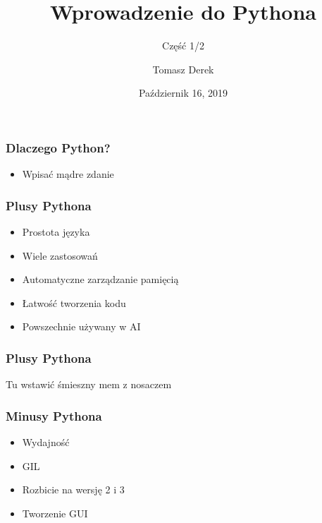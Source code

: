 \documentclass[17pt]{beamer}
\title{Wprowadzenie do Pythona}
\subtitle{Część 1/2}
\author{Tomasz Derek}
\institute{KMS}
\date{Październik 16, 2019}
\begin{document}
 
\frame{\titlepage}
 
\begin{frame}
\frametitle{Dlaczego Python?}
\begin{itemize}
\item Wpisać mądre zdanie
\end{itemize}
\end{frame} 
 
\begin{frame}
\frametitle{Plusy Pythona}
\begin{itemize}
\item Prostota języka
\item Wiele zastosowań
\item Automatyczne zarządzanie pamięcią
\item Łatwość tworzenia kodu
\item Powszechnie używany w AI
\end{itemize}
\end{frame}

\begin{frame}
\frametitle{Plusy Pythona}
Tu wstawić śmieszny mem z nosaczem
\end{frame}



\begin{frame}
\frametitle{Minusy Pythona}
\begin{itemize}
\item Wydajność
\item GIL
\item Rozbicie na wersję 2 i 3
\item Tworzenie GUI
\end{itemize}
\end{frame}
\end{document}
